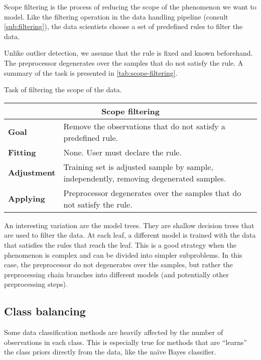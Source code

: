 Scope filtering is the process of reducing the scope of the phenomenon we want to model.
Like the filtering operation in the data handling pipeline (consult \cref{sub:filtering}),
the data scientists choose a set of predefined rules to filter the data.

Unlike outlier detection, we assume that the rule is fixed and known beforehand.  The
preprocessor degenerates over the samples that do not satisfy the rule.  A summary of the
task is presented in \cref{tab:scope-filtering}.

\begin{tablebox}[label=tab:scope-filtering]{Task of filtering the scope of the data.}
  \centering
  \begin{tabular}{lp{6cm}}
    \toprule
    \multicolumn{2}{c}{\textbf{Scope filtering}} \\
    \midrule
    \textbf{Goal} &
      Remove the observations that do not satisfy a predefined rule. \\
    \textbf{Fitting} &
      None. User must declare the rule. \\
    \textbf{Adjustment} &
      Training set is adjusted sample by sample, independently, removing degenerated
      samples. \\
    \textbf{Applying} &
      Preprocessor degenerates over the samples that do not satisfy the rule. \\
    \bottomrule
  \end{tabular}
\end{tablebox}

An interesting variation are the model trees.  They are shallow
decision trees that are used to filter the data.  At each leaf, a different model is
trained with the data that satisfies the rules that reach the leaf.  This is a good
strategy when the phenomenon is complex and can be divided into simpler subproblems.
In this case, the preprocessor do not degenerates over the samples, but rather the
preprocessing chain branches into different models (and potentially other preprocessing
steps).

\subsection{Class balancing}

Some data classification methods are heavily affected by the number of observations in each
class.  This is especially true for methods that are ``learns'' the class priors directly
from the data, like the naïve Bayes classifier.

